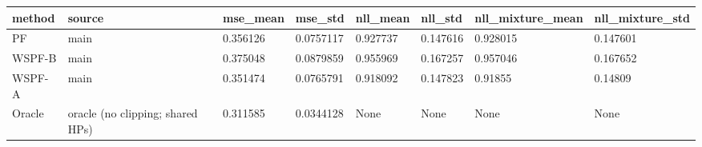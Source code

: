 \begin{tabular}{llllllll}
\hline
method & source & mse\_mean & mse\_std & nll\_mean & nll\_std & nll\_mixture\_mean & nll\_mixture\_std \\
\hline
PF & main & 0.356126 & 0.0757117 & 0.927737 & 0.147616 & 0.928015 & 0.147601 \\
WSPF-B & main & 0.375048 & 0.0879859 & 0.955969 & 0.167257 & 0.957046 & 0.167652 \\
WSPF-A & main & 0.351474 & 0.0765791 & 0.918092 & 0.147823 & 0.91855 & 0.14809 \\
Oracle & oracle (no clipping; shared HPs) & 0.311585 & 0.0344128 & None & None & None & None \\
\hline
\end{tabular}

